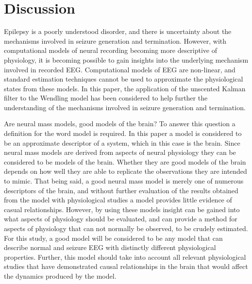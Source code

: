 \section{Discussion}

Epilepsy is a poorly understood disorder, and there is uncertainty about the mechanisms involved in seizure generation and termination. However, with computational models of neural recording becoming more descriptive of physiology, it is becoming possible to gain insights into the underlying mechanism involved in recorded EEG. Computational models of EEG are non-linear, and standard estimation techniques cannot be used to approximate the physiological states from these models. In this paper, the application of the unscented Kalman filter to the Wendling model has been considered to help further the understanding of the mechanisms involved in seizure generation and termination.


Are neural mass models, good models of the brain? To answer this question a definition for the word model is required. In this paper a model is considered to be an approximate descriptor of a system, which in this case is the brain. Since neural mass models are derived from aspects of neural physiology they can be considered to be models of the brain. Whether they are good models of the brain depends on how well they are able to replicate the observations they are intended to mimic. That being said, a good neural mass model is merely one of numerous descriptors of the brain, and without further evaluation of the results obtained from the model with physiological studies a model provides little evidence of casual relationships. However, by using these models insight can be gained into what aspects of physiology should be evaluated, and can provide a method for aspects of physiology that can  not normally be observed, to be crudely estimated. For this study, a good model will be considered to be any model that can describe normal and seizure EEG with distinctly different physiological properties. Further, this model should take into account all relevant physiological studies that have demonstrated causal relationships in the brain that would affect the dynamics produced by the model. 

